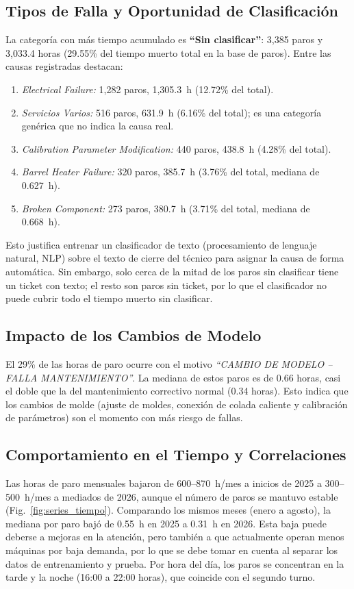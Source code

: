 \documentclass[conference]{IEEEtran}
\begin{document}
\subsection{Tipos de Falla y Oportunidad de Clasificación}
La categoría con más tiempo acumulado es \textbf{``Sin clasificar''}: 3,385 paros y 3,033.4 horas (29.55\% del tiempo muerto total en la base de paros). Entre las causas registradas destacan:
\begin{enumerate}
    \item \textit{Electrical Failure:} 1,282 paros, 1,305.3~h (12.72\% del total).
    \item \textit{Servicios Varios:} 516 paros, 631.9~h (6.16\% del total); es una categoría genérica que no indica la causa real.
    \item \textit{Calibration Parameter Modification:} 440 paros, 438.8~h (4.28\% del total).
    \item \textit{Barrel Heater Failure:} 320 paros, 385.7~h (3.76\% del total, mediana de 0.627~h).
    \item \textit{Broken Component:} 273 paros, 380.7~h (3.71\% del total, mediana de 0.668~h).
\end{enumerate}
Esto justifica entrenar un clasificador de texto (procesamiento de lenguaje natural, NLP) sobre el texto de cierre del técnico para asignar la causa de forma automática. Sin embargo, solo cerca de la mitad de los paros sin clasificar tiene un ticket con texto; el resto son paros sin ticket, por lo que el clasificador no puede cubrir todo el tiempo muerto sin clasificar.

\subsection{Impacto de los Cambios de Modelo}
El 29\% de las horas de paro ocurre con el motivo \textit{``CAMBIO DE MODELO -- FALLA MANTENIMIENTO''}. La mediana de estos paros es de 0.66 horas, casi el doble que la del mantenimiento correctivo normal (0.34 horas). Esto indica que los cambios de molde (ajuste de moldes, conexión de colada caliente y calibración de parámetros) son el momento con más riesgo de fallas.

\subsection{Comportamiento en el Tiempo y Correlaciones}
Las horas de paro mensuales bajaron de 600--870~h/mes a inicios de 2025 a 300--500~h/mes a mediados de 2026, aunque el número de paros se mantuvo estable (Fig.~\ref{fig:series_tiempo}). Comparando los mismos meses (enero a agosto), la mediana por paro bajó de 0.55~h en 2025 a 0.31~h en 2026. Esta baja puede deberse a mejoras en la atención, pero también a que actualmente operan menos máquinas por baja demanda, por lo que se debe tomar en cuenta al separar los datos de entrenamiento y prueba. Por hora del día, los paros se concentran en la tarde y la noche (16:00 a 22:00 horas), que coincide con el segundo turno.
\end{document}
